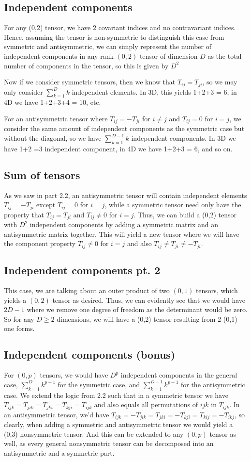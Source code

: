 \documentclass{article}
\begin{document}
		\pagebreak	
		\subsection{Independent components}
			For any (0,2) tensor, we have 2 covariant indices and no contravariant indices. Hence, assuming the tensor is non-symmetric to distinguish this case from symmetric and antisymmetric, we can simply represent the number of independent components in any rank $(0,2)$ tensor of dimension $D$ as the total number of components in the tensor, so this is given by $D^2$
			
			Now if we consider symmetric tensors, then we know that $T_{ij} = T_{ji}$, so we may only consider $\sum_{k=1}^{D} k$ independent elements. In 3D, this yields 1+2+3 = 6, in 4D we have 1+2+3+4 = 10, etc.
			
			For an antisymmetric tensor where $T_{ij} = -T_{ji}$ for $i\neq j$ and $T_{ij} = 0$ for $i=j$, we consider the same amount of independent components as the symmetric case but without the diagonal, so we have $\sum_{k=1}^{D-1} k$ independent components. In 3D we have 1+2 =3 independent component, in 4D we have 1+2+3 = 6, and so on.
		\subsection{Sum of tensors}
			As we saw in part 2.2, an antisymmetric tensor will contain independent elements $T_{ij} = -T_{ji}$ except $T_{ij} = 0$ for $i=j$, while a symmetric tensor need only have the property that $T_{ij} = T_{ji}$ and $T_{ij} \neq 0$ for $i=j$. Thus, we can build a (0,2) tensor with $D^2$ independent components by adding a symmetric matrix and an antisymmetric matrix together. This will yield a new tensor where we will have the component property $T_{ij} \neq 0$ for $i=j$ and also $T_{ij} \neq T_{ji} \neq -T_{ji}$.
		\subsection{Independent components pt. 2}
			This case, we are talking about an outer product of two $(0,1)$ tensors, which yields a $(0,2)$ tensor as desired. Thus, we can evidently see that we would have $2D - 1$ where we remove one degree of freedom as the determinant would be zero. So for any $D \geq 2$ dimensions, we will have a (0,2) tensor resulting from 2 (0,1) one forms.
		\subsection{Independent components (bonus)}
			For $(0,p)$ tensors, we would have $D^p$ independent components in the general case, $\sum_{k=1}^D k^{p-1}$ for the symmetric case, and $\sum_{k=1}^{D-1} k^{p-1}$ for the antisymmetric case. We extend the logic from 2.2 such that in a symmetric tensor we have $T_{ijk} = T_{jik} = T_{jki} = T_{kji} = T_{ijk}$ and also equals all permutations of $ijk$ in $T_{ijk}$. In an antisymmetric tensor, we'd have $T_{ijk} = - T_{jik} = T_{jki} = -T_{kji} = T_{kij} = -T_{ikj}$, so clearly, when adding a symmetric and antisymmetric tensor we would yield a (0,3) nonsymmetric tensor. And this can be extended to any $(0,p)$ tensor as well, as every general nonsymmetric tensor can be decomposed into an antisymmetric and a symmetric part.
\end{document}
